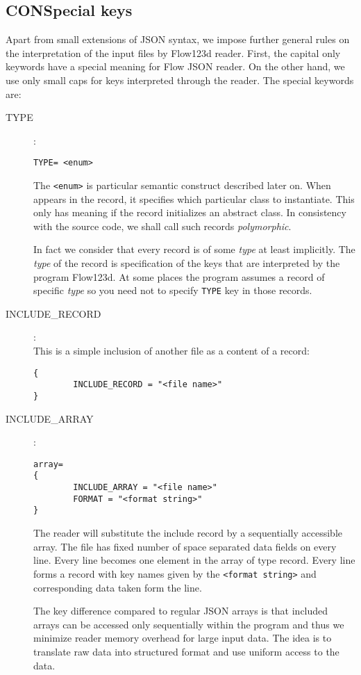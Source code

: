 \subsection{CONSpecial keys}
Apart from small extensions of JSON syntax, we impose further general rules on the interpretation of the input files by Flow123d reader.
First, the capital only keywords  
have a special meaning for Flow JSON reader. On the other hand, we use only small caps for keys interpreted through the reader.
The special keywords are:
\begin{description}

\item[TYPE]:\\ 
\begin{verbatim}
TYPE= <enum>
\end{verbatim}
The \verb'<enum>' is particular semantic construct described later on. 
When appears in the record, it specifies which particular class to instantiate. This only has meaning if the record initializes
an abstract class. In consistency with the source code, we shall call such records {\it polymorphic}. 


In fact we consider
that every record is of some {\it type} at least implicitly. The {\it type} of the record is specification of the keys that are
interpreted by the program Flow123d. At some places the program assumes a record of specific {\it type} so you need not to specify 
\verb'TYPE' key in those records.

\item[INCLUDE\_RECORD]:\\
This is a simple inclusion of another file as a content of a record:
\begin{verbatim}
{
        INCLUDE_RECORD = "<file name>"
}
\end{verbatim}

\item[INCLUDE\_ARRAY]:\\
\begin{verbatim}
array=
{
        INCLUDE_ARRAY = "<file name>"
        FORMAT = "<format string>"
}       
\end{verbatim}
The reader will substitute the include record by a sequentially accessible array. The file has fixed number of 
space separated data fields on every line. Every line becomes one element in the array of type record. Every line forms a 
record with key names given by the \verb'<format string>' 
and corresponding data taken form the line.

The key difference compared to regular JSON arrays is that included arrays can be accessed only sequentially 
within the program and thus we minimize reader memory overhead for large input data. The idea is to translate raw data into structured
format and use uniform access to the data.


\end{description}
